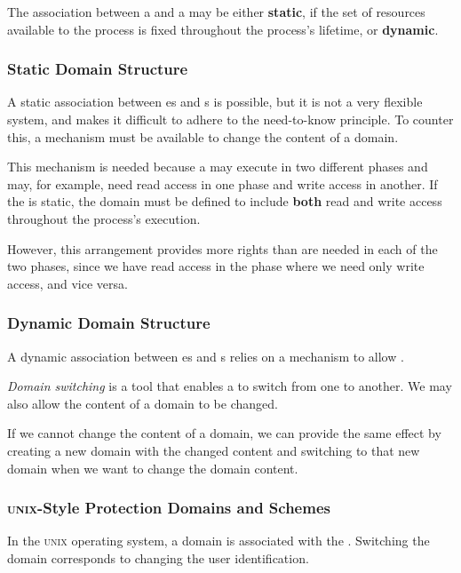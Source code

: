 The association between a  and a  may be either \textbf{static}, if the set of resources available to the process is fixed throughout the process’s lifetime, or \textbf{dynamic}.

\subsubsection{Static Domain Structure}\label{subsubsec:Static_Domain_Structure}
A static association between es and s is possible, but it is not a very flexible system, and makes it difficult to adhere to the need-to-know principle.
To counter this, a mechanism must be available to change the content of a domain.

This mechanism is needed because a  may execute in two different phases and may, for example, need read access in one phase and write access in another.
If the  is static, the domain must be defined to include \textbf{both} read and write access throughout the process's execution.

However, this arrangement provides more rights than are needed in each of the two phases, since we have read access in the phase where we need only write access, and vice versa.

\subsubsection{Dynamic Domain Structure}\label{subsubsec:Dynamic_Domain_Structure}
A dynamic association between es and s relies on a mechanism to allow .

\begin{definition}\label{def:Domain_Switching}
  \emph{Domain switching} is a tool that enables a  to switch from one  to another.
  We may also allow the content of a domain to be changed.
\end{definition}

If we cannot change the content of a domain, we can provide the same effect by creating a new domain with the changed content and switching to that new domain when we want to change the domain content.

\subsubsection{\textsc{unix}-Style Protection Domains and Schemes}\label{subsubsec:UNIX_Protections}
In the \textsc{unix} operating system, a domain is associated with the .
Switching the domain corresponds to changing the user identification.

